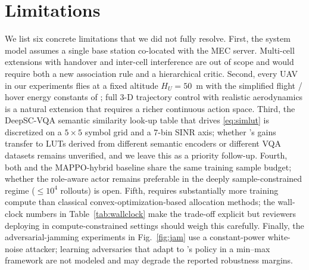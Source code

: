 \section{Limitations}\label{sec:limit}

We list six concrete limitations that we did not fully resolve. First,
the system model assumes a single base station co-located with the MEC
server. Multi-cell extensions with handover and inter-cell interference
are out of scope and would require both a new association rule and a
hierarchical critic. Second, every UAV in our experiments flies at a
fixed altitude $H_U=50$~m with the simplified flight / hover energy
constants of \cite{liu2024jamminguav}; full 3-D trajectory control with
realistic aerodynamics is a natural extension that requires a richer
continuous action space. Third, the DeepSC-VQA semantic similarity
look-up table that drives \eqref{eq:simlut} is discretized on a
$5\!\times\!5$ symbol grid and a $7$-bin SINR axis; whether \method's
gains transfer to LUTs derived from different semantic encoders or
different VQA datasets remains unverified, and we leave this as a
priority follow-up. Fourth, both \method and the MAPPO-hybrid baseline
share the same training sample budget; whether the role-aware actor
remains preferable in the deeply sample-constrained regime
($\le 10^{4}$ rollouts) is open. Fifth, \method requires substantially
more training compute than classical convex-optimization-based
allocation methods; the wall-clock numbers in
Table~\ref{tab:wallclock} make the trade-off explicit but reviewers
deploying in compute-constrained settings should weigh this carefully.
Finally, the adversarial-jamming experiments in
Fig.~\ref{fig:jam} use a constant-power white-noise attacker; learning
adversaries that adapt to \method's policy in a min--max framework are
not modeled and may degrade the reported robustness margins.
